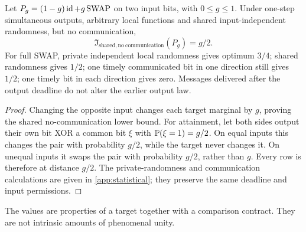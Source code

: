 \begin{proposition}\label{p2-11}
Let \(P_g=(1-g)\operatorname{id}+g\operatorname{SWAP}\) on two input bits, with \(0\le g\le1\). Under one-step simultaneous outputs, arbitrary local functions and shared input-independent randomness, but no communication,
\begin{equation}\label{eq:weak-swap}
 \mathfrak I_{\mathrm{shared,no\ communication}}(P_g)=g/2.
\end{equation}
For full SWAP, private independent local randomness gives optimum \(3/4\); shared randomness gives \(1/2\); one timely communicated bit in one direction still gives \(1/2\); one timely bit in each direction gives zero. Messages delivered after the output deadline do not alter the earlier output law.
\end{proposition}
\begin{proof}
Changing the opposite input changes each target marginal by \(g\), proving the shared no-communication lower bound. For attainment, let both sides output their own bit XOR a common bit \(\xi\) with \(\mathbb P(\xi=1)=g/2\). On equal inputs this changes the pair with probability \(g/2\), while the target never changes it. On unequal inputs it swaps the pair with probability \(g/2\), rather than \(g\). Every row is therefore at distance \(g/2\). The private-randomness and communication calculations are given in \cref{app:statistical}; they preserve the same deadline and input permissions.
\end{proof}
The values are properties of a target together with a comparison contract. They are not intrinsic amounts of phenomenal unity.

